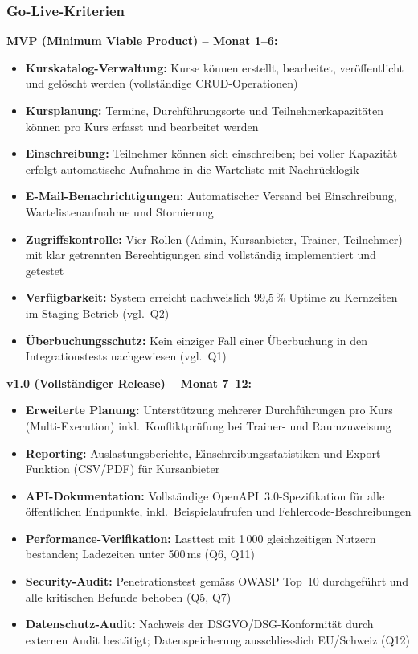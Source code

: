 \subsubsection{Go-Live-Kriterien}

\textbf{MVP (Minimum Viable Product) -- Monat 1--6:}
\begin{itemize}[leftmargin=1.5em]
  \item \textbf{Kurskatalog-Verwaltung:} Kurse können erstellt, bearbeitet,
        veröffentlicht und gelöscht werden (vollständige CRUD-Operationen)
  \item \textbf{Kursplanung:} Termine, Durchführungsorte und Teilnehmerkapazitäten
        können pro Kurs erfasst und bearbeitet werden
  \item \textbf{Einschreibung:} Teilnehmer können sich einschreiben; bei voller
        Kapazität erfolgt automatische Aufnahme in die Warteliste mit
        Nachrücklogik
  \item \textbf{E-Mail-Benachrichtigungen:} Automatischer Versand bei Einschreibung,
        Wartelistenaufnahme und Stornierung
  \item \textbf{Zugriffskontrolle:} Vier Rollen (Admin, Kursanbieter, Trainer,
        Teilnehmer) mit klar getrennten Berechtigungen sind vollständig
        implementiert und getestet
  \item \textbf{Verfügbarkeit:} System erreicht nachweislich 99,5\,\% Uptime
        zu Kernzeiten im Staging-Betrieb (vgl.\ Q2)
  \item \textbf{Überbuchungsschutz:} Kein einziger Fall einer Überbuchung in
        den Integrationstests nachgewiesen (vgl.\ Q1)
\end{itemize}

\textbf{v1.0 (Vollständiger Release) -- Monat 7--12:}
\begin{itemize}[leftmargin=1.5em]
  \item \textbf{Erweiterte Planung:} Unterstützung mehrerer Durchführungen pro Kurs
  (Multi-Execution) inkl.\ Konfliktprüfung bei Trainer- und Raumzuweisung
  \item \textbf{Reporting:} Auslastungsberichte, Einschreibungsstatistiken und
  Export-Funktion (CSV/PDF) für Kursanbieter
  \item \textbf{API-Dokumentation:} Vollständige OpenAPI~3.0-Spezifikation für alle
  öffentlichen Endpunkte, inkl.\ Beispielaufrufen und Fehlercode-Beschreibungen
  \item \textbf{Performance-Verifikation:} Lasttest mit 1\,000 gleichzeitigen Nutzern
  bestanden; Ladezeiten unter 500\,ms (Q6, Q11)
  \item \textbf{Security-Audit:} Penetrationstest gemäss OWASP Top~10 durchgeführt
  und alle kritischen Befunde behoben (Q5, Q7)
  \item \textbf{Datenschutz-Audit:} Nachweis der DSGVO/DSG-Konformität durch
  externen Audit bestätigt; Datenspeicherung ausschliesslich EU/Schweiz (Q12)
\end{itemize}

